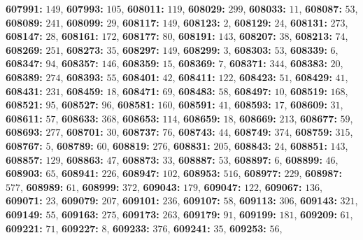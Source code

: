 \textsf{\bfseries 607991:} $149$, \textsf{\bfseries 607993:} $105$, \textsf{\bfseries 608011:} $119$, \textsf{\bfseries 608029:} $299$, \textsf{\bfseries 608033:} $11$, \textsf{\bfseries 608087:} $53$, \textsf{\bfseries 608089:} $241$, \textsf{\bfseries 608099:} $29$, \textsf{\bfseries 608117:} $149$, \textsf{\bfseries 608123:} $2$, \textsf{\bfseries 608129:} $24$, \textsf{\bfseries 608131:} $273$, \textsf{\bfseries 608147:} $28$, \textsf{\bfseries 608161:} $172$, \textsf{\bfseries 608177:} $80$, \textsf{\bfseries 608191:} $143$, \textsf{\bfseries 608207:} $38$, \textsf{\bfseries 608213:} $74$, \textsf{\bfseries 608269:} $251$, \textsf{\bfseries 608273:} $35$, \textsf{\bfseries 608297:} $149$, \textsf{\bfseries 608299:} $3$, \textsf{\bfseries 608303:} $53$, \textsf{\bfseries 608339:} $6$, \textsf{\bfseries 608347:} $94$, \textsf{\bfseries 608357:} $146$, \textsf{\bfseries 608359:} $15$, \textsf{\bfseries 608369:} $7$, \textsf{\bfseries 608371:} $344$, \textsf{\bfseries 608383:} $20$, \textsf{\bfseries 608389:} $274$, \textsf{\bfseries 608393:} $55$, \textsf{\bfseries 608401:} $42$, \textsf{\bfseries 608411:} $122$, \textsf{\bfseries 608423:} $51$, \textsf{\bfseries 608429:} $41$, \textsf{\bfseries 608431:} $231$, \textsf{\bfseries 608459:} $18$, \textsf{\bfseries 608471:} $69$, \textsf{\bfseries 608483:} $58$, \textsf{\bfseries 608497:} $10$, \textsf{\bfseries 608519:} $168$, \textsf{\bfseries 608521:} $95$, \textsf{\bfseries 608527:} $96$, \textsf{\bfseries 608581:} $160$, \textsf{\bfseries 608591:} $41$, \textsf{\bfseries 608593:} $17$, \textsf{\bfseries 608609:} $31$, \textsf{\bfseries 608611:} $57$, \textsf{\bfseries 608633:} $368$, \textsf{\bfseries 608653:} $114$, \textsf{\bfseries 608659:} $18$, \textsf{\bfseries 608669:} $213$, \textsf{\bfseries 608677:} $59$, \textsf{\bfseries 608693:} $277$, \textsf{\bfseries 608701:} $30$, \textsf{\bfseries 608737:} $76$, \textsf{\bfseries 608743:} $44$, \textsf{\bfseries 608749:} $374$, \textsf{\bfseries 608759:} $315$, \textsf{\bfseries 608767:} $5$, \textsf{\bfseries 608789:} $60$, \textsf{\bfseries 608819:} $276$, \textsf{\bfseries 608831:} $205$, \textsf{\bfseries 608843:} $24$, \textsf{\bfseries 608851:} $143$, \textsf{\bfseries 608857:} $129$, \textsf{\bfseries 608863:} $47$, \textsf{\bfseries 608873:} $33$, \textsf{\bfseries 608887:} $53$, \textsf{\bfseries 608897:} $6$, \textsf{\bfseries 608899:} $46$, \textsf{\bfseries 608903:} $65$, \textsf{\bfseries 608941:} $226$, \textsf{\bfseries 608947:} $102$, \textsf{\bfseries 608953:} $516$, \textsf{\bfseries 608977:} $229$, \textsf{\bfseries 608987:} $577$, \textsf{\bfseries 608989:} $61$, \textsf{\bfseries 608999:} $372$, \textsf{\bfseries 609043:} $179$, \textsf{\bfseries 609047:} $122$, \textsf{\bfseries 609067:} $136$, \textsf{\bfseries 609071:} $23$, \textsf{\bfseries 609079:} $207$, \textsf{\bfseries 609101:} $236$, \textsf{\bfseries 609107:} $58$, \textsf{\bfseries 609113:} $306$, \textsf{\bfseries 609143:} $321$, \textsf{\bfseries 609149:} $55$, \textsf{\bfseries 609163:} $275$, \textsf{\bfseries 609173:} $263$, \textsf{\bfseries 609179:} $91$, \textsf{\bfseries 609199:} $181$, \textsf{\bfseries 609209:} $61$, \textsf{\bfseries 609221:} $71$, \textsf{\bfseries 609227:} $8$, \textsf{\bfseries 609233:} $376$, \textsf{\bfseries 609241:} $35$, \textsf{\bfseries 609253:} $56$, 
